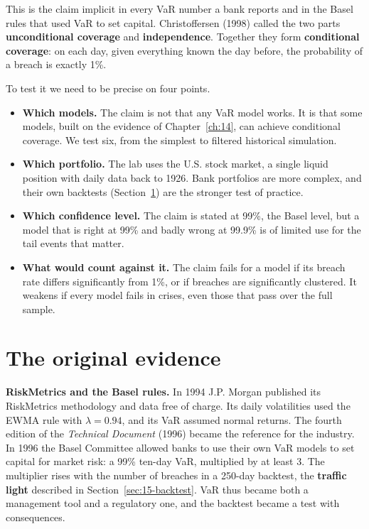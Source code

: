 This is the claim implicit in every VaR number a bank reports and in the Basel rules that used VaR to set capital. Christoffersen (1998) called the two parts \textbf{unconditional coverage} and \textbf{independence}. Together they form \textbf{conditional coverage}: on each day, given everything known the day before, the probability of a breach is exactly 1\%.

To test it we need to be precise on four points.

\begin{itemize}
  \item \textbf{Which models.} The claim is not that any VaR model works. It is that some models, built on the evidence of Chapter~\ref{ch:14}, can achieve conditional coverage. We test six, from the simplest to filtered historical simulation.
  \item \textbf{Which portfolio.} The lab uses the U.S. stock market, a single liquid position with daily data back to 1926. Bank portfolios are more complex, and their own backtests (Section~\ref{sec:15-evidence}) are the stronger test of practice.
  \item \textbf{Which confidence level.} The claim is stated at 99\%, the Basel level, but a model that is right at 99\% and badly wrong at 99.9\% is of limited use for the tail events that matter.
  \item \textbf{What would count against it.} The claim fails for a model if its breach rate differs significantly from 1\%, or if breaches are significantly clustered. It weakens if every model fails in crises, even those that pass over the full sample.
\end{itemize}

\section{The original evidence}
\label{sec:15-evidence}

\textbf{RiskMetrics and the Basel rules.} In 1994 J.P. Morgan published its RiskMetrics methodology and data free of charge. Its daily volatilities used the EWMA rule with $\lambda = 0.94$, and its VaR assumed normal returns. The fourth edition of the \emph{Technical Document} (1996) became the reference for the industry. In 1996 the Basel Committee allowed banks to use their own VaR models to set capital for market risk: a 99\% ten-day VaR, multiplied by at least 3. The multiplier rises with the number of breaches in a 250-day backtest, the \textbf{traffic light} described in Section~\ref{sec:15-backtest}. VaR thus became both a management tool and a regulatory one, and the backtest became a test with consequences.

